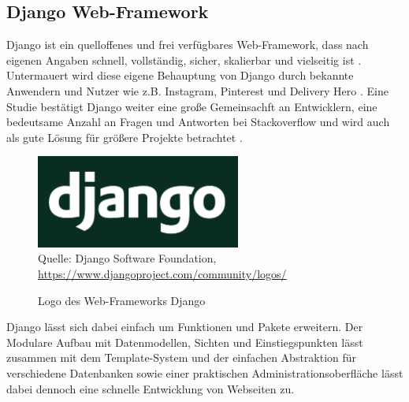 \documentclass[12pt,oneside,titlepage,listof=totoc,bibliography=totoc]{scrartcl}
\begin{document}


\subsection{Django Web-Framework}

Django ist ein quelloffenes und frei verfügbares Web-Framework, dass nach eigenen Angaben schnell, vollständig, sicher, skalierbar und vielseitig ist \parencite[]{54-django-overview}. Untermauert wird diese eigene Behauptung von Django durch bekannte Anwendern und Nutzer wie z.B. Instagram, Pinterest und Delivery Hero \parencite{56-django-stackshare}. Eine Studie bestätigt Django weiter eine große Gemeinsachft an Entwicklern, eine bedeutsame Anzahl an Fragen und Antworten bei Stackoverflow und wird auch als gute Lösung für größere Projekte betrachtet \parencite{55-djnago-ghimire}. 

\begin{figure}[H]
	\caption{Logo des Web-Frameworks Django}\label{fig:django-logo}
	\includegraphics[width=0.6\textwidth]{django-logo-negative.png}
	\\
	Quelle: Django Software Foundation, \url{https://www.djangoproject.com/community/logos/}
\end{figure}

Django lässt sich dabei einfach um Funktionen und Pakete erweitern. Der Modulare Aufbau mit Datenmodellen, Sichten und Einstiegspunkten lässt zusammen mit dem Template-System und der einfachen Abstraktion für verschiedene Datenbanken sowie einer praktischen Administrationsoberfläche lässt dabei dennoch eine schnelle Entwicklung von Webseiten zu.



\end{document}
